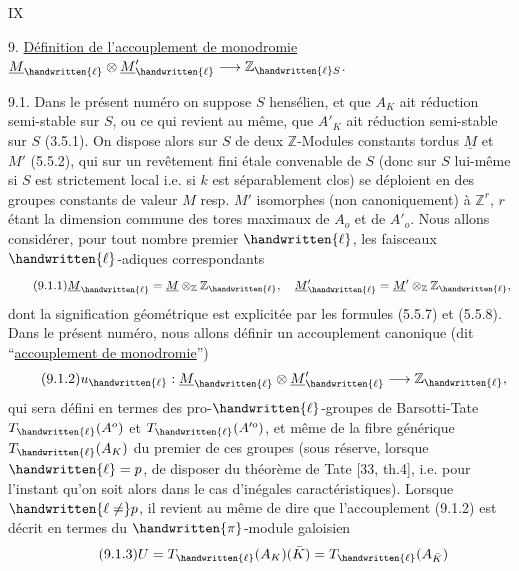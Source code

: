 \hfill IX

9. \uline{Définition de l'accouplement de monodromie} $\underline M_{\handwritten{\ell}}\otimes\underline M'_{\handwritten{\ell}}\longrightarrow\mathbb Z_{\handwritten{\ell} S}$.

9.1. Dans le présent numéro on suppose $S$ hensélien, et que $A_K$ ait réduction semi-stable sur $S$, ou ce qui revient au même, que $A'_K$ ait réduction semi-stable sur $S$ (3.5.1). On dispose alors sur $S$ de deux $\mathbb Z$-Modules constants tordus $\underline M$ et $M'$ (5.5.2), qui sur un revêtement fini étale convenable de $S$ (donc sur $S$ lui-même si $S$ est strictement local i.e. si $k$ est séparablement clos) se déploient en des groupes constants de valeur $M$ resp. $M'$ isomorphes (non canoniquement) à $\mathbb Z^r$, $r$ étant la dimension commune des tores maximaux de $A_o$ et de $A'_o$. Nous allons considérer, pour tout nombre premier $\handwritten{\ell}$, les faisceaux $\handwritten{\ell}$-adiques correspondants
\[
\tag*{(9.1.1)}
\underline M_{\handwritten{\ell}}=\underline M\otimes_{\mathbb Z}\mathbb Z_{\handwritten{\ell}},\quad
\underline M'_{\handwritten{\ell}}=\underline M'\otimes_{\mathbb Z}\mathbb Z_{\handwritten{\ell}},
\]
dont la signification géométrique est explicitée par les formules (5.5.7) et (5.5.8). Dans le présent numéro, nous allons définir un accouplement canonique (dit ``\uline{accouplement de monodromie}'')
\[
\tag*{(9.1.2)}
u_{\handwritten{\ell}}:\underline M_{\handwritten{\ell}}\otimes\underline M'_{\handwritten{\ell}}\longrightarrow\mathbb Z_{\handwritten{\ell}},
\]
qui sera défini en termes des pro-$\handwritten{\ell}$-groupes de Barsotti-Tate $T_{\handwritten{\ell}}(A^o)$ et $T_{\handwritten{\ell}}(A'^{o})$, et même de la fibre générique $T_{\handwritten{\ell}}(A_K)$ du premier de ces groupes (sous réserve, lorsque $\handwritten{\ell}=p$, de disposer du théorème de Tate [33, th.4], i.e. pour l'instant qu'on soit alors dans le cas d'inégales caractéristiques). Lorsque $\handwritten{\ell\ne}p$, il revient au même de dire que l'accouplement (9.1.2) est décrit en termes du $\handwritten{\pi}$-module galoisien
\[
\tag*{(9.1.3)}
U=T_{\handwritten{\ell}}(A_K)(\bar K)=T_{\handwritten{\ell}}(A_{\bar K})
\]
